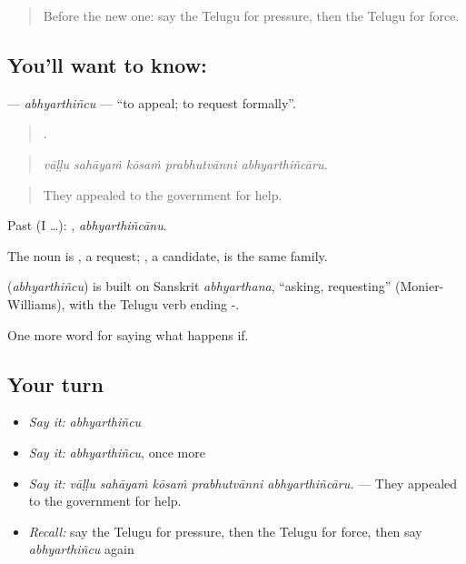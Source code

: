 \label{lesson:TE-C424-abhyarthincu}



\begin{quote}
Before the new one: say the Telugu for pressure, then the Telugu for force.
\end{quote}

\subsection*{You'll want to know: }
\textbf{} — \emph{abhyarthiñcu} — \textquotedblleft{}to appeal; to request formally\textquotedblright{}.

\begin{quote}
    .
\end{quote}

\begin{quote}
\emph{vāḷḷu sahāyaṁ kōsaṁ prabhutvānni abhyarthiñcāru.}
\end{quote}

\begin{quote}
They appealed to the government for help.
\end{quote}

Past (I …): , \emph{abhyarthiñcānu}.

The noun is , a request; , a candidate, is the same family.

\begin{cousinweb}
\textbf{} (\emph{abhyarthiñcu}) is built on Sanskrit \emph{abhyarthana}, \textquotedblleft{}asking, requesting\textquotedblright{} (Monier-Williams), with the Telugu verb ending -.
\end{cousinweb}

\begin{grammarlens}[title={What you've built}]
One more word for saying what happens if.
\end{grammarlens}

\subsection*{Your turn}
\begin{itemize}
\raggedright
  \item \emph{Say it:} \emph{abhyarthiñcu}
  \item \emph{Say it:} \emph{abhyarthiñcu}, once more
  \item \emph{Say it:} \emph{vāḷḷu sahāyaṁ kōsaṁ prabhutvānni abhyarthiñcāru.} — They appealed to the government for help.
  \item \emph{Recall:} say the Telugu for pressure, then the Telugu for force, then say \emph{abhyarthiñcu} again
\end{itemize}

